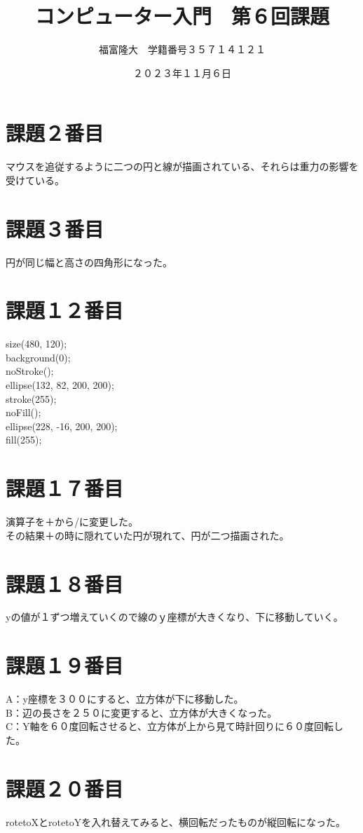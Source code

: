 \documentclass{jsarticle}
\title{コンピューター入門　第６回課題}
\author{福富隆大　学籍番号３５７１４１２１}
\date{２０２３年１１月６日}
\begin{document}
\maketitle
\section{課題２番目}
マウスを追従するように二つの円と線が描画されている、それらは重力の影響を受けている。
\section{課題３番目}
円が同じ幅と高さの四角形になった。
\section{課題１２番目}
size(480, 120);\\
background(0);\\
noStroke();\\
ellipse(132, 82, 200, 200);\\
stroke(255);\\
noFill();\\
ellipse(228, -16, 200, 200);\\
fill(255);\\
\section{課題１７番目}
演算子を＋から/に変更した。\\
その結果＋の時に隠れていた円が現れて、円が二つ描画された。
\section{課題１８番目}
yの値が１ずつ増えていくので線のｙ座標が大きくなり、下に移動していく。
\section{課題１９番目}
A：y座標を３００にすると、立方体が下に移動した。\\
B：辺の長さを２５０に変更すると、立方体が大きくなった。\\
C：Y軸を６０度回転させると、立方体が上から見て時計回りに６０度回転した。\\
\section{課題２０番目}
rotetoXとrotetoYを入れ替えてみると、横回転だったものが縦回転になった。
\end{document}
